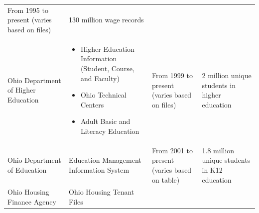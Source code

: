 \documentclass[
]{book}
\providecommand{\tightlist}{%
  \setlength{\itemsep}{0pt}\setlength{\parskip}{0pt}}
\begin{document}
\begin{longtable}[]{@{}llll@{}}
\begin{minipage}[t]{0.18\columnwidth}
From 1995 to
present
(varies
based on
files)\strut
\end{minipage} & \begin{minipage}[t]{0.18\columnwidth}\raggedright
130 million
wage records\strut
\end{minipage}\tabularnewline
\begin{minipage}[t]{0.19\columnwidth}\raggedright
Ohio
Department
of Higher
Education\strut
\end{minipage} & \begin{minipage}[t]{0.34\columnwidth}\raggedright
\begin{itemize}
\tightlist
\item
  Higher Education
  Information (Student,
  Course, and Faculty)
\item
  Ohio Technical Centers
\item
  Adult Basic and Literacy
  Education
\end{itemize}\strut
\end{minipage} & \begin{minipage}[t]{0.18\columnwidth}\raggedright
From 1999 to
present
(varies
based on
files)\strut
\end{minipage} & \begin{minipage}[t]{0.18\columnwidth}\raggedright
2 million
unique
students in
higher
education\strut
\end{minipage}\tabularnewline
\begin{minipage}[t]{0.19\columnwidth}\raggedright
Ohio
Department
of
Education\strut
\end{minipage} & \begin{minipage}[t]{0.34\columnwidth}\raggedright
Education Management
Information System\strut
\end{minipage} & \begin{minipage}[t]{0.18\columnwidth}\raggedright
From 2001 to
present
(varies
based on
table)\strut
\end{minipage} & \begin{minipage}[t]{0.18\columnwidth}\raggedright
1.8 million
unique
students in
K12
education\strut
\end{minipage}\tabularnewline
\begin{minipage}[t]{0.19\columnwidth}\raggedright
Ohio
Housing
Finance
Agency\strut
\end{minipage} & \begin{minipage}[t]{0.34\columnwidth}\raggedright
Ohio Housing Tenant Files\strut
\end{minipage} & \begin{minipage}[t]{0.18\columnwidth}\raggedright

\end{minipage}
\end{longtable}
\end{document}

